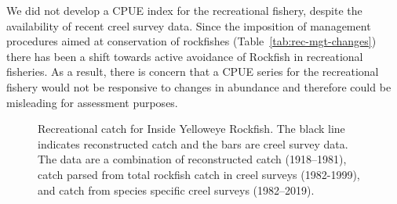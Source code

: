 \documentclass[11pt]{book}
\begin{document}
We did not develop a CPUE index for the recreational fishery, despite the availability of recent creel survey data. Since the imposition of management procedures aimed at conservation of rockfishes (Table~\ref{tab:rec-mgt-changes}) there has been a shift towards active avoidance of Rockfish in recreational fisheries. As a result, there is concern that a CPUE series for the recreational fishery would not be responsive to changes in abundance and therefore could be misleading for assessment purposes.

\clearpage
\begin{figure}[htb]

{\centering {} 

}

\caption{Recreational catch for Inside Yelloweye Rockfish. The black line indicates reconstructed catch and the bars are creel survey data. The data are a combination of reconstructed catch (1918--1981), catch parsed from total rockfish catch in creel surveys (1982-1999), and catch from species specific creel surveys (1982--2019).}\label{fig:reccatch}
\end{figure}
\end{document}
